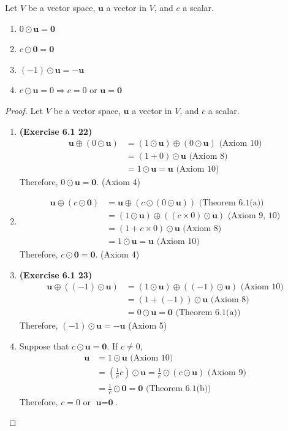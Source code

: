 \begin{theorem}
	Let $V$ be a vector space, $\textbf{u}$ a vector in $V$, and $c$ a scalar.
	\begin{enumerate}
		\item $0 \odot \textbf{u} = \textbf{0}$
		\item $c \odot \textbf{0} = \textbf{0}$
		\item $(-1) \odot \textbf{u} = -\textbf{u}$
		\item $c \odot \textbf{u} = 0 \Rightarrow c = 0 \mbox{ or } \textbf{u} = \textbf{0}$
	\end{enumerate}
\end{theorem}
\begin{proof}
	Let $V$ be a vector space, $\textbf{u}$ a vector in $V$, and $c$ a scalar.
	\begin{enumerate}
		\item \textbf{(Exercise 6.1 22)} \begin{align*}
			\textbf{u} \oplus (0 \odot \textbf{u}) &= (1 \odot \textbf{u}) \oplus (0 \odot \textbf{u}) \mbox{ (Axiom 10) } \\
			&= (1 + 0) \odot \textbf{u} \mbox{ (Axiom 8) } \\
			&= 1 \odot \textbf{u} = \textbf{u} \mbox{ (Axiom 10) }
		\end{align*} 
		Therefore, $0 \odot \textbf{u} = \textbf{0}$. (Axiom 4)
		\item \begin{align*}
			\textbf{u} \oplus (c \odot \textbf{0}) &= \textbf{u} \oplus (c \odot (0 \odot \textbf{u})) \mbox{ (Theorem 6.1(a)) } \\
			&= (1 \odot \textbf{u}) \oplus ((c\times 0) \odot \textbf{u}) \mbox{ (Axiom 9, 10) } \\
			&= (1 + c \times 0) \odot \textbf{u} \mbox{ (Axiom 8) } \\
			&= 1 \odot \textbf{u} = \textbf{u} \mbox{ (Axiom 10) }
		\end{align*}
		Therefore, $c \odot \textbf{0} = \textbf{0}$. (Axiom 4)
		\item \textbf{(Exercise 6.1 23)} \begin{align*}
			\textbf{u} \oplus ((-1) \odot \textbf{u}) &= (1 \odot \textbf{u}) \oplus ((-1) \odot \textbf{u}) \mbox{ (Axiom 10) } \\
			&= (1 + (-1)) \odot \textbf{u} \mbox{ (Axiom 8) } \\
			&= 0 \odot \textbf{u} = \textbf{0} \mbox{ (Theorem 6.1(a)) }
		\end{align*}
		Therefore, $(-1) \odot \textbf{u} = -\textbf{u}$ (Axiom 5)
		\item Suppose that $c \odot \textbf{u} = \textbf{0}$. If $c \neq 0$, \begin{align*}
			\textbf{u} &= 1 \odot \textbf{u} \mbox{ (Axiom 10) } \\
			&= (\frac{1}{c}c) \odot \textbf{u} = \frac{1}{c} \odot (c \odot \textbf{u}) \mbox{ (Axiom 9) } \\
			&= \frac{1}{c} \odot \textbf{0} = \textbf{0} \mbox{ (Theorem 6.1(b)) }
		\end{align*}
		Therefore, $c = 0$ or $\textbf{u} = \textbf{0}$.
	\end{enumerate}
\end{proof}

